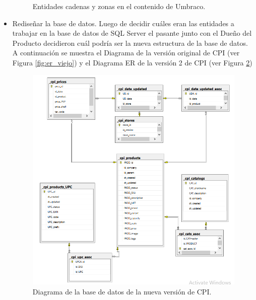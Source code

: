 \begin{itemize}
\begin{figure}[H]
\begin{center}
  \caption{Entidades cadenas y zonas en el contenido de Umbraco.}
  \label{fig:contenido}
  \end{center}
  \end{figure}
\pagebreak
 \item Rediseñar la base de datos. Luego de decidir cuáles eran las entidades a trabajar en la base de datos de SQL Server el pasante junto con el Dueño del Producto decidieron cuál podría ser la nueva estructura de la base de datos. A continuación se muestra el Diagrama de la versión original de CPI (ver Figura \ref{fig:er_viejo}) y el Diagrama ER de la versión 2 de CPI (ver Figura \ref{fig:er_nuevo})
 

  \begin{figure}[H]
  \begin{center}
  \includegraphics[width=\textwidth]{er.png}
  \caption{Diagrama de la base de datos de la nueva versión de CPI.}
  \label{fig:er_nuevo}
  \end{center}
  \end{figure}


\end{itemize}
